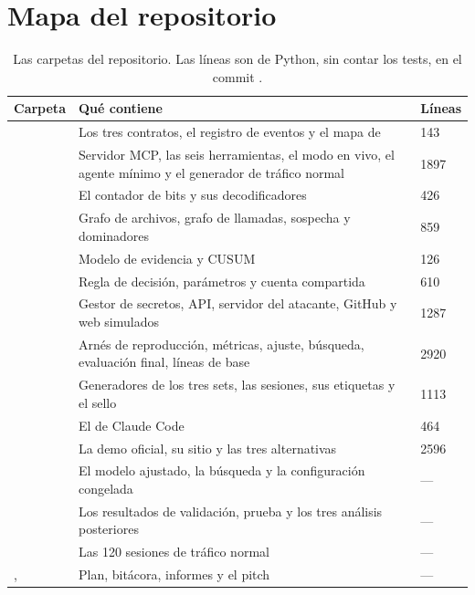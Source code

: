 \section{Mapa del repositorio}\label{ap:mapa}

\begin{table}[ht]
\caption{Las carpetas del repositorio. Las líneas son de Python, sin contar los tests, en el commit
.}\label{tab:mapa}
\small
\begin{tabularx}{\textwidth}{@{}P{3.1cm}LR{1.4cm}@{}}
\toprule
Carpeta & Qué contiene & Líneas \\
\midrule
{} & Los tres contratos, el registro de eventos y el mapa de  & \num{143} \\
 & Servidor MCP, las seis herramientas, el modo en vivo, el agente mínimo y el generador
  de tráfico normal & \num{1897} \\
 & El contador de bits y sus decodificadores & \num{426} \\
 & Grafo de archivos, grafo de llamadas, sospecha y dominadores & \num{859} \\
 & Modelo de evidencia y CUSUM & \num{126} \\
 & Regla de decisión, parámetros y cuenta compartida & \num{610} \\
 & Gestor de secretos, API, servidor del atacante, GitHub y web simulados & \num{1287} \\
 & Arnés de reproducción, métricas, ajuste, búsqueda, evaluación final, líneas de base &
  \num{2920} \\
 & Generadores de los tres sets, las sesiones, sus etiquetas y el sello & \num{1113} \\
 & El  de Claude Code & \num{464} \\
 & La demo oficial, su sitio y las tres alternativas & \num{2596} \\
 & El modelo ajustado, la búsqueda y la configuración congelada & --- \\
 & Los resultados de validación, prueba y los tres análisis posteriores & --- \\
 & Las 120 sesiones de tráfico normal & --- \\
,  & Plan, bitácora, informes y el pitch & --- \\
\bottomrule
\end{tabularx}
\end{table}

